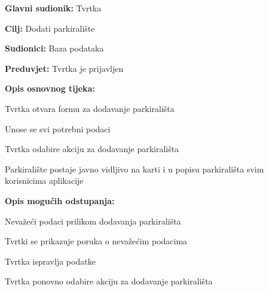 \noindent {}
\begin{packed_item}

	\item \textbf{Glavni sudionik:} Tvrtka
	\item \textbf{Cilj:} Dodati parkiralište
	\item \textbf{Sudionici:} Baza podataka
	\item \textbf{Preduvjet:} Tvrtka je prijavljen
	\item \textbf{Opis osnovnog tijeka:}
	
	\item[] \begin{packed_enum}
		
		\item Tvrtka otvara formu za dodavanje parkirališta
		\item Unose se svi potrebni podaci
		\item Tvrtka odabire akciju za dodavanje parkirališta
		\item Parkiralište postaje javno vidljivo na karti i u popisu parkirališta svim korisnicima aplikacije

	\end{packed_enum}
	
	\item  \textbf{Opis mogućih odstupanja:}
	
	\item[] \begin{packed_item}
		
		\item[6.a] Nevažeći podaci prilikom dodavanja parkirališta
		\item[] \begin{packed_enum}
			
			\item Tvrtki se prikazuje poruka o nevažećim podacima
			\item Tvrtka ispravlja podatke
			\item Tvrtka ponovno odabire akciju za dodavanje parkirališta
			
		\end{packed_enum}
		
	\end{packed_item}
\end{packed_item}

\pagebreak


